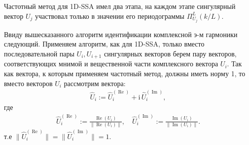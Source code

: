 \documentclass[specialist,
               substylefile = spbu.rtx,
               subf,href,colorlinks=true, 12pt]{disser}
\def\RE{\mathop{\mathrm{Re}}}
\def\IM{\mathop{\mathrm{Im}}}
\newcommand{\I}{\mathrm{i}}
\begin{document}
Частотный метод для 1D-SSA имел два этапа, на каждом этапе сингулярный вектор $U_j$ участвовал только в значении его периодограммы $\Pi_{U_j}^L(k/L)$.

Ввиду вышесказанного алгоритм идентификации комплексной э-м гармоники следующий. Применяем алгоритм, как для 1D-SSA, только вместо последовательной пары $U_i, U_{i+1}$ сингулярных векторов берем пару векторов, соответствующих мнимой и вещественной части  комплексного вектора $U_i$.
Так как вектора, к которым применяем частотный метод, должны иметь норму 1, то вместо векторов $U_i$ рассмотрим вектора: 
\begin{gather*}
\widehat{U}_{i} := \widehat{U}^{(\RE)}_{i} +  \I \,\widehat{U}^{(\IM)}_{i},
\end{gather*}
где
\begin{gather*} 
\widehat{U}^{(\RE)}_{i}:= \frac{\RE(U_i)}{\|\RE(U_i) \|}, \quad \widehat{U}^{(\IM)}_{i}:= \frac{\IM(U_i)}{\|\IM(U_i) \|}.
\end{gather*}
т.е $\| \widehat{U}^{(\RE)}_{i}\| = \| \widehat{U}^{(\IM)}_{i} \| = 1$. 
\end{document}
